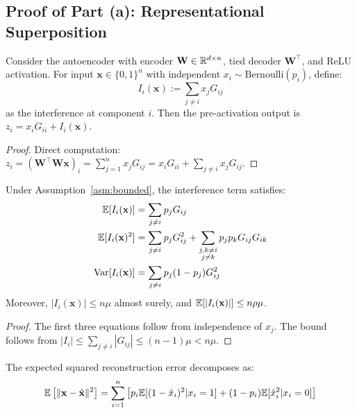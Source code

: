 \subsection{Proof of Part (a): Representational Superposition}

\begin{lemma}
\label{lem:recon_decomp}
Consider the autoencoder with encoder $\mathbf{W} \in \mathbb{R}^{d \times n}$, tied decoder $\mathbf{W}^\top$, and ReLU activation. For input $\mathbf{x} \in \{0,1\}^n$ with independent $x_i \sim \text{Bernoulli}(p_i)$, define:
\begin{equation}
I_i(\mathbf{x}) := \sum_{j \neq i} x_j G_{ij}
\end{equation}
as the interference at component $i$. Then the pre-activation output is $z_i = x_i G_{ii} + I_i(\mathbf{x})$.
\end{lemma}

\begin{proof}
Direct computation: $z_i = (\mathbf{W}^\top \mathbf{W} \mathbf{x})_i = \sum_{j=1}^n x_j G_{ij} = x_i G_{ii} + \sum_{j \neq i} x_j G_{ij}$.
\end{proof}

\begin{lemma}
\label{lem:interference_stats}
Under Assumption~\ref{asm:bounded}, the interference term satisfies:
\begin{align}
\mathbb{E}[I_i(\mathbf{x})] &= \sum_{j \neq i} p_j G_{ij} \\
\mathbb{E}[I_i(\mathbf{x})^2] &= \sum_{j \neq i} p_j G_{ij}^2 + \sum_{\substack{j, k \neq i \\ j \neq k}} p_j p_k G_{ij} G_{ik} \\
\text{Var}[I_i(\mathbf{x})] &= \sum_{j \neq i} p_j(1-p_j) G_{ij}^2
\end{align}
Moreover, $|I_i(\mathbf{x})| \leq n\mu$ almost surely, and $\mathbb{E}[|I_i(\mathbf{x})|] \leq n\rho\mu$.
\end{lemma}

\begin{proof}
The first three equations follow from independence of $x_j$. The bound follows from $|I_i| \leq \sum_{j \neq i} |G_{ij}| \leq (n-1)\mu < n\mu$.
\end{proof}

\begin{proposition}
\label{prop:exact_recon}
The expected squared reconstruction error decomposes as:
\begin{equation}
\mathbb{E}\left[\|\mathbf{x} - \hat{\mathbf{x}}\|^2\right] = \sum_{i=1}^n \left[ p_i \mathbb{E}[(1 - \hat{x}_i)^2 | x_i = 1] + (1-p_i) \mathbb{E}[\hat{x}_i^2 | x_i = 0] \right]
\end{equation}
\end{proposition}

